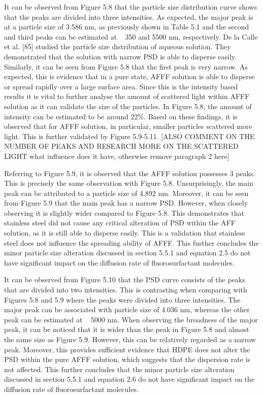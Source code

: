 \documentclass[12pt]{report}
\begin{document}
 It can be observed from Figure 5.8 that the particle size distribution curve shows that the peaks are divided into three intensities. As expected, the major peak is at a particle size of 3.586 nm, as previously shown in Table 5.1 and the second and third peaks can be estimated at ~ 350 and 5500 nm, respectively. De la Calle et al. [85] studied the particle size distribution of aqueous solution. They demonstrated that the solution with narrow PSD is able to disperse easily. Similarly, it can be seen from Figure 5.8 that the first peak is very narrow. As expected, this is evidence that in a pure state, AFFF solution is able to disperse or spread rapidly over a large surface area. 
 Since this is the intensity based results it is vital to further analyse the amount of scattered light within AFFF solution as it can validate the size of the particles. In Figure 5.8, the amount of intensity can be estimated to be around 22\%. Based on these findings, it is observed that for AFFF solution, in particular, smaller particles scattered more light. This is further validated by Figure 5.9-5.11.
 [ALSO COMMENT ON THE NUMBER OF PEAKS AND RESEARCH MORE ON THE SCATTERED LIGHT what influence does it have, otherwise remove paragraph 2 here]


Referring to Figure 5.9, it is observed that the AFFF solution possesses 3 peaks. This is precisely the same observation with Figure 5.8. Unsurprisingly, the main peak can be attributed to a particle size of 4.892 nm. Moreover, it can be seen from Figure 5.9 that the main peak has a narrow PSD. However, when closely observing it is slightly wider compared to Figure 5.8. This demonstrates that stainless steel did not cause any critical alteration of PSD within the AFF solution, as it is still able to disperse easily. This is a validation that stainless steel does not influence the spreading ability of AFFF. This further concludes the minor particle size alteration discussed in section 5.5.1 and equation 2.5 do not have significant impact on the diffusion rate of fluorosurfactant molecules.     
  

It can be observed from Figure 5.10 that the PSD curve consists of the peaks that are divided into two intensities. This is contrasting when comparing with Figures 5.8 and 5.9 where the peaks were divided into three intensities. The major peak can be associated with particle size of 4.036 nm, whereas the other peak can be estimated at ~ 5000 nm. When observing the broadness of the major peak, it can be noticed that it is wider than the peak in Figure 5.8 and almost the same size as Figure 5.9. However, this can be relatively regarded as a narrow peak. Moreover, this provides sufficient evidence that HDPE does not alter the PSD within the pure AFFF solution, which suggests that the dispersion rate is not affected. This further concludes that the minor particle size alteration discussed in section 5.5.1 and equation 2.6 do not have significant impact on the diffusion rate of fluorosurfactant molecules.    
  
\end{document}
